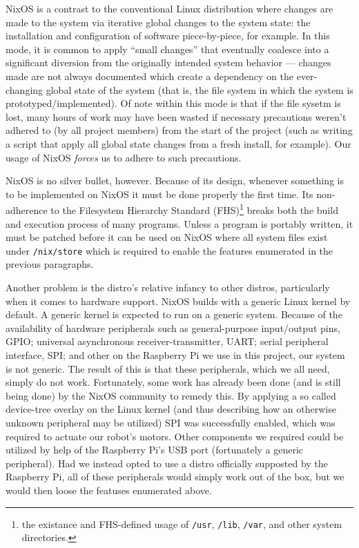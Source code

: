 NixOS is a contrast to the conventional Linux distribution where changes are made to the system via iterative global changes to the system state:
the installation and configuration of software piece-by-piece, for example.
In this mode, it is common to apply ``small changes'' that eventually coalesce into a significant diversion from the originally intended system behavior ---
changes made are not always documented which create a dependency on the ever-changing global state of the system (that is, the file system in which the system is prototyped/implemented).
Of note within this mode is that if the file sysetm is lost, many hours of work may have been wasted if necessary precautions weren't adhered to (by all project members) from the start of the project (such as writing a script that apply all global state changes from a fresh install, for example).
Our usage of NixOS \textit{forces} us to adhere to such precautions.

NixOS is no silver bullet, however.
Because of its design, whenever something is to be implemented on NixOS it must be done properly the first time.
Its non-adherence to the Filesystem Hierarchy Standard (FHS)\footnote{the existance and FHS-defined usage of \texttt{/usr}, \texttt{/lib}, \texttt{/var}, and other system directories.} breaks both the build and execution process of many programs.
Unless a program is portably written, it must be patched before it can be used on NixOS where all system files exist under \texttt{/nix/store} which is required to enable the features enumerated in the previous paragraphs.

Another problem is the distro's relative infancy to other distros, particularly when it comes to hardware support.
NixOS builds with a generic Linux kernel by default.
A generic kernel is expected to run on a generic system.
Because of the availability of hardware peripherals such as general-purpose input/output pins, GPIO;
universal asynchronous receiver-transmitter, UART;
serial peripheral interface, SPI; and other on the Raspberry Pi we use in this project, our system is not generic.
The result of this is that these peripherals, which we all need, simply do not work.
Fortunately, some work has already been done (and is still being done) by the NixOS community to remedy this.
By applying a so called device-tree overlay on the Linux kernel (and thus describing how an otherwise unknown peripheral may be utilized) SPI was successfully enabled,
which was required to actuate our robot's motors.
Other components we required could be utilized by help of the Raspberry Pi's USB port (fortunately a generic peripheral).
Had we instead opted to use a distro officially supposted by the Raspberry Pi, all of these peripherals would simply work out of the box, but we would then loose the featuses enumerated above.

